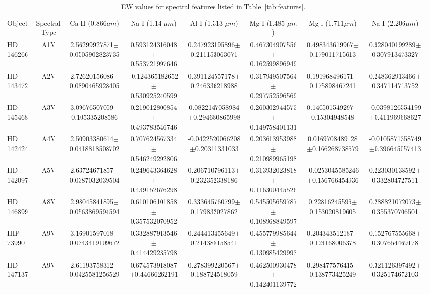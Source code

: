 \begin{table}
\begin{center}
\caption{EW values for spectral features listed in Table~\ref{tab:features}.~\label{tab:EWval}}
\begin{tabular}{l|c|c|c|c|c|c|c}
Object & Spectral Type & Ca II (0.866$\mu m$) & Na I (1.14 $\mu m$) & Al I (1.313 $\mu m$) & Mg I (1.485 $\mu m$) & Mg I (1.711$\mu m$) & Na I (2.206$\mu m$) \\
HD 146266 & A1V & 2.56299927871$\pm$0.0505902823735 & 0.593124316048$\pm$0.553721997646 & 0.247923195896$\pm$0.211153063071 & 0.467304907556$\pm$0.162599896949 & 0.498343619967$\pm$0.179011715613 & 0.928040199289$\pm$0.307913473327 \\
HD 143472 & A2V & 2.72620156086$\pm$0.0890465928405 & -0.124365182652$\pm$0.530925240599 & 0.391124557178$\pm$0.246336218988 & 0.317949507564$\pm$0.297752596569 & 0.191968496171$\pm$0.175898467241 & 0.248362913466$\pm$0.347114713752 \\
HD 145468 & A3V & 3.09676507059$\pm$0.105335208586 & 0.219012800854$\pm$0.493783546746 & 0.0822147058984$\pm$0.294680865998 & 0.260302944573$\pm$0.149758401131 & 0.140501549297$\pm$0.15304948548 & -0.0398126554199$\pm$0.411969668627 \\
HD 142424 & A4V & 2.50903380614$\pm$0.0418818508702 & 0.707624567334$\pm$0.546249292806 & -0.0422520066208$\pm$0.20311331033 & 0.203613953988$\pm$0.210989965198 & 0.0169708489128$\pm$0.166268738679 & -0.0105871358749$\pm$0.396645057413 \\
HD 142097 & A5V & 2.63724671857$\pm$0.0387032039504 & 0.249643364628$\pm$0.439152676298 & 0.206710796113$\pm$0.232352338186 & 0.313932023818$\pm$0.116300445526 & -0.0253045585246$\pm$0.156766454936 & 0.223030138592$\pm$0.332804727511 \\
HD 146899 & A8V & 2.98045841895$\pm$0.0563869594594 & 0.610106101858$\pm$0.357532070952 & 0.333645760799$\pm$0.179832027862 & 0.545505659787$\pm$0.108968849597 & 0.22816245596$\pm$0.153020819605 & 0.288821072073$\pm$0.355370706501 \\
HIP 73990 & A9V & 3.16901597018$\pm$0.0343419109672 & 0.332887913546$\pm$0.414429235798 & 0.244413455649$\pm$0.214388158541 & 0.455779985644$\pm$0.130985429993 & 0.204343512187$\pm$0.124168006378 & 0.152767555668$\pm$0.307654469178 \\
HD 147137 & A9V & 2.61193758312$\pm$0.0425581256529 & 0.674573918087$\pm$0.44666262191 & 0.278399220567$\pm$0.188724518059 & 0.462500930478$\pm$0.142401139772 & 0.298477576415$\pm$0.138773425249 & 0.321126397492$\pm$0.325174672103 \\

\end{tabular}
\end{center}
\end{table}
